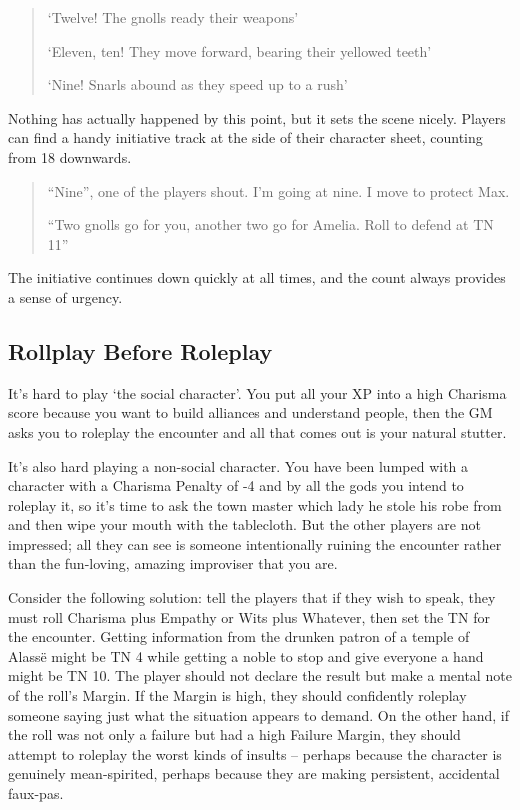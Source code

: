 \begin{quote}
`Twelve! The gnolls ready their weapons'

`Eleven, ten! They move forward, bearing their yellowed teeth'

`Nine! Snarls abound as they speed up to a rush'
\end{quote}

Nothing has actually happened by this point, but it sets the scene nicely.  Players can find a handy initiative track at the side of their character sheet, counting from 18 downwards.

\begin{quote}
``Nine'', one of the players shout.  I'm going at nine.  I move to protect Max.

``Two gnolls go for you, another two go for Amelia.  Roll to defend at TN 11''

\end{quote}

The initiative continues down quickly at all times, and the count always provides a sense of urgency.

\subsection{Rollplay Before Roleplay}

It's hard to play `the social character'.  You put all your XP into a high Charisma score because you want to build alliances and understand people, then the GM asks you to roleplay the encounter and all that comes out is your natural stutter.

It's also hard playing a non-social character.  You have been lumped with a character with a Charisma Penalty of -4 and by all the gods you intend to roleplay it, so it's time to ask the town master which lady he stole his robe from and then wipe your mouth with the tablecloth.  But the other players are not impressed; all they can see is someone intentionally ruining the encounter rather than the fun-loving, amazing improviser that you are.

Consider the following solution: tell the players that if they wish to speak, they must roll Charisma plus Empathy or Wits plus Whatever, then set the TN for the encounter.  Getting information from the drunken patron of a temple of Alass\"{e} might be TN 4 while getting a noble to stop and give everyone a hand might be TN 10.  The player should not declare the result but make a mental note of the roll's Margin.  If the Margin is high, they should confidently roleplay someone saying just what the situation appears to demand.  On the other hand, if the roll was not only a failure but had a high Failure Margin, they should attempt to roleplay the worst kinds of insults -- perhaps because the character is genuinely mean-spirited, perhaps because they are making persistent, accidental faux-pas.

